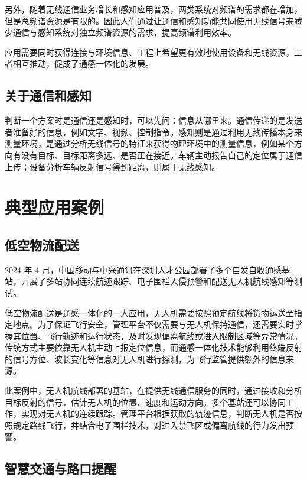 \documentclass[12pt,a4paper,UTF8,fontset=fandol]{ctexart}
\begin{document}
另外，随着无线通信业务增长和感知应用普及，两类系统对频谱的需求都在增加，但是总频谱资源是有限的。因此人们通过让通信和感知功能共同使用无线信号来减少通信与感知系统对独立频谱资源的需求，提高频谱利用效率。

应用需要同时获得连接与环境信息、工程上希望更有效地使用设备和无线资源，二者相互推动，促成了通感一体化的发展。

\subsection{关于通信和感知}

判断一个方案时是通信还是感知时，可以先问：信息从哪里来。通信传递的是发送者准备好的信息，例如文字、视频、控制指令。感知则是通过利用无线传播本身来测量环境，是通过分析无线信号的特征来获得物理环境中的测量信息，例如某个方向有没有目标、目标距离多远、是否正在接近。车辆主动报告自己的定位属于通信上传；设备分析车辆反射信号得到距离，则属于无线感知。

\section{典型应用案例}

\subsection{低空物流配送}

2024 年 4 月，中国移动与中兴通讯在深圳人才公园部署了多个自发自收通感基站，开展了多站协同连续航迹跟踪、电子围栏入侵预警和配送无人机航线感知等测试\cite{zte2024uav}。

低空物流配送是通感一体化的一大应用，无人机需要按照预定航线将货物运送至指定地点。为了保证飞行安全，管理平台不仅需要与无人机保持通信，还需要实时掌握其位置、飞行轨迹和运行状态，及时发现偏离航线或进入限制区域等异常情况。传统方式主要依靠无人机主动上报定位信息，而通感一体化技术能够利用终端反射的信号方位、波长变化等信息对无人机进行探测，为飞行监管提供额外的信息来源。

此案例中，无人机航线部署的基站，在提供无线通信服务的同时，通过接收和分析目标反射的信号，估计无人机的位置、速度和运动方向。多个基站还可以协同工作，实现对无人机的连续跟踪。管理平台根据获取的轨迹信息，判断无人机是否按照规定路线飞行，并结合电子围栏技术，对进入禁飞区或偏离航线的行为发出预警。

\subsection{智慧交通与路口提醒}
\end{document}
